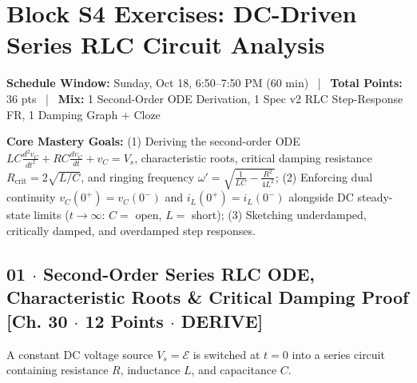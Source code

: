 \documentclass[10pt,letterpaper]{article}
\begin{document}
\section*{Block S4 Exercises: DC-Driven Series RLC Circuit Analysis}

  \textbf{Schedule Window:} Sunday, Oct 18, 6:50--7:50 PM (60 min) ~|~
  \textbf{Total Points:} 36 pts ~|~
  \textbf{Mix:} 1 Second-Order ODE Derivation, 1 Spec v2 RLC Step-Response FR, 1 Damping Graph + Cloze



  \textbf{Core Mastery Goals:} (1) Deriving the second-order ODE $LC\frac{d^2 v_C}{dt^2} + RC\frac{dv_C}{dt} + v_C = V_s$, characteristic roots, critical damping resistance $R_{\text{crit}} = 2\sqrt{L/C}$, and ringing frequency $\omega' = \sqrt{\frac{1}{LC} - \frac{R^2}{4L^2}}$; (2) Enforcing dual continuity $v_C(0^+)=v_C(0^-)$ and $i_L(0^+)=i_L(0^-)$ alongside DC steady-state limits ($t \to \infty$: $C =$ open, $L =$ short); (3) Sketching underdamped, critically damped, and overdamped step responses.


\subsection*{01 $\cdot$ Second-Order Series RLC ODE, Characteristic Roots \& Critical Damping Proof \hfill [Ch. 30 $\cdot$ 12 Points $\cdot$ DERIVE]}

A constant DC voltage source $V_s = \mathcal{E}$ is switched at $t = 0$ into a series circuit containing resistance $R$, inductance $L$, and capacitance $C$.
\end{document}
